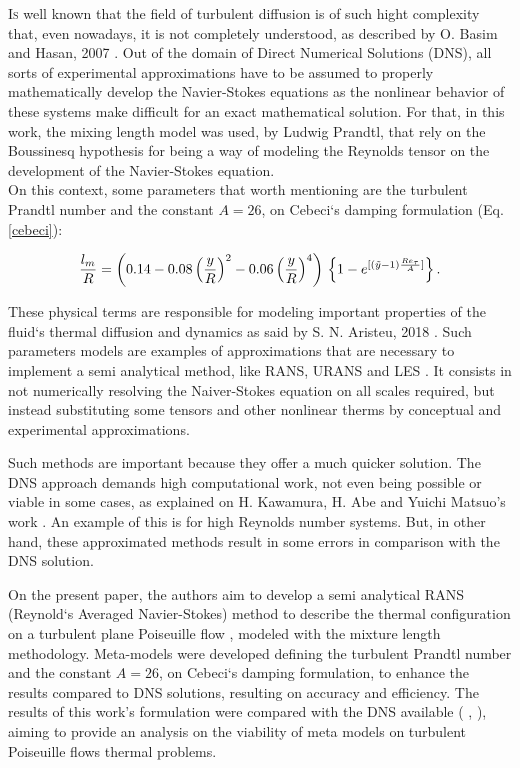 \documentclass[10pt]{article} %
\begin{document}
\lettrine[nindent=0em,lines=2]{I}s well known that the field of turbulent diffusion is of such hight complexity that, even nowadays, it is not completely understood, as described by O. Basim and Hasan, 2007 \cite{hasan}. Out of the domain of Direct Numerical Solutions (DNS), all sorts of experimental approximations have to be assumed to properly mathematically develop the Navier-Stokes equations as the nonlinear behavior of these systems \cite{John} make difficult for an exact mathematical solution.  For that, in this work, the mixing length model was used, by Ludwig Prandtl, that rely on the Boussinesq hypothesis for being a way of modeling the Reynolds tensor on the development of the Navier-Stokes equation.\\ 
On this context, some parameters that worth mentioning are the turbulent Prandtl number \cite{Prandtl} and the constant $A = 26$, on Cebeci`s damping formulation \cite{Cebeci} (Eq. \ref{cebeci}):

\begin{equation}\label{cebeci}
\frac{l_m}{R} = \left( 0.14 - 0.08 \left(\frac{y}{R}\right)^2 - 0.06\left(\frac{y}{R}\right)^4\right) \\
\left\{  1 - e^{[(\tilde{y} - 1) \frac{Re_\tau}{A}]}\right\}.	
\end{equation}

These physical terms are responsible for modeling important properties of the fluid`s thermal diffusion and dynamics as said by S. N. Aristeu, 2018 \cite{aristeu}. Such parameters models are examples of approximations that are necessary to implement a semi analytical method, like RANS, URANS and LES \cite{aristeu}. It consists in not numerically resolving the Naiver-Stokes equation on all scales required, but instead substituting some tensors and other nonlinear therms by conceptual and experimental approximations.

Such methods are important because they offer a much quicker solution. The DNS approach demands high computational work, not even being possible or viable in some cases, as explained on H. Kawamura, H. Abe and Yuichi Matsuo's work \cite{Abe}. An example of this is for high Reynolds number systems. But, in other hand, these approximated methods result in some errors in comparison with the DNS solution.    

On the present paper, the authors aim to develop a semi analytical RANS (Reynold`s Averaged Navier-Stokes) method to describe the thermal configuration on a turbulent plane Poiseuille flow \cite{Poiseuille}, modeled with the mixture length methodology. Meta-models were developed defining the turbulent Prandtl number \cite{Prandtl} and the constant $A = 26$, on Cebeci`s damping formulation, to enhance the results compared to DNS solutions, resulting on accuracy and efficiency. The results of this work's formulation were compared with the DNS available (\cite{DNS1020} , \cite{DNS150}), aiming to provide an analysis on the viability of meta models on turbulent Poiseuille flows thermal problems.\\       
 
\end{document}
